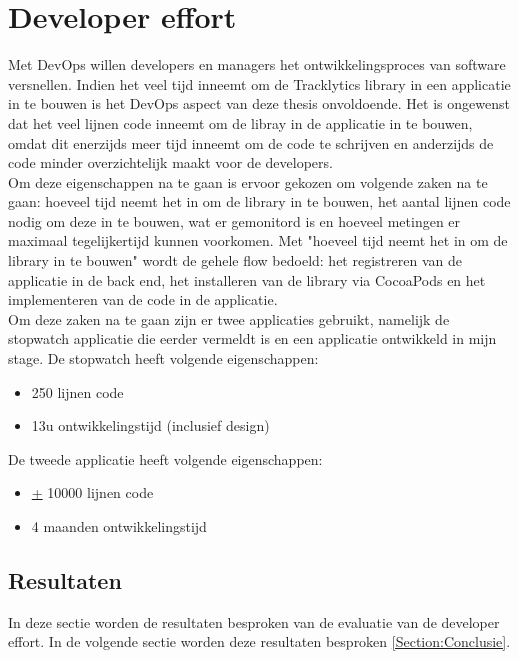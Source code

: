 \section{Developer effort}
Met DevOps willen developers en managers het ontwikkelingsproces van software versnellen. Indien het veel tijd inneemt om de Tracklytics library in een applicatie in te bouwen is het DevOps aspect van deze thesis onvoldoende. Het is ongewenst dat het veel lijnen code inneemt om de libray in de applicatie in te bouwen, omdat dit enerzijds meer tijd inneemt om de code te schrijven en anderzijds de code minder overzichtelijk maakt voor de developers. \\

Om deze eigenschappen na te gaan is ervoor gekozen om volgende zaken na te gaan: hoeveel tijd neemt het in om de library in te bouwen, het aantal lijnen code nodig om deze in te bouwen, wat er gemonitord is en hoeveel metingen er maximaal tegelijkertijd kunnen voorkomen. Met "hoeveel tijd neemt het in om de library in te bouwen" wordt de gehele flow bedoeld: het registreren van de applicatie in de back end, het installeren van de library via CocoaPods en het implementeren van de code in de applicatie. \\

Om deze zaken na te gaan zijn er twee applicaties gebruikt, namelijk de stopwatch applicatie die eerder vermeldt is en een applicatie ontwikkeld in mijn stage. De stopwatch heeft volgende eigenschappen:
\begin{itemize}
\item 250 lijnen code
\item 13u ontwikkelingstijd (inclusief design)
\end{itemize} 

De tweede applicatie heeft volgende eigenschappen:
\begin{itemize}
\item \underline{+} 10000 lijnen code
\item 4 maanden ontwikkelingstijd
\end{itemize}

\subsection{Resultaten}
In deze sectie worden de resultaten besproken van de evaluatie van de developer effort. In de volgende sectie worden deze resultaten besproken \ref{Section:Conclusie}.
